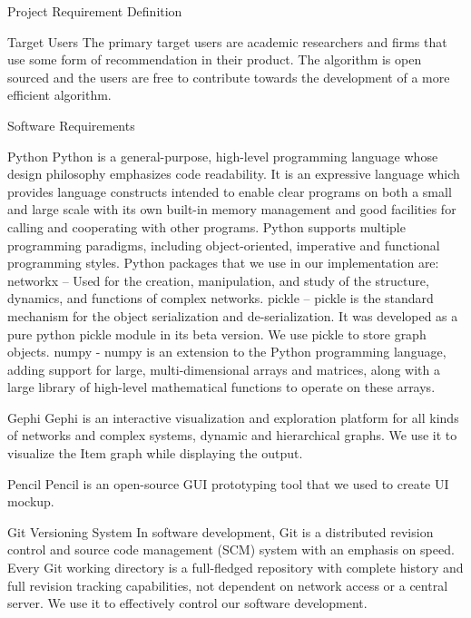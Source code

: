 \documentclass{report}
\begin{document}
\begin{projChapter}{Project Requirement Definition}
 \begin{projSection}{Target Users}
  The primary target users are academic researchers and firms that use some form of recommendation in their product. The algorithm is open sourced and the users are free to contribute towards the development of a more efficient algorithm.
 \end{projSection}
 
 \begin{projSection}{Software Requirements}
  \begin{projSubSection}{Python}
  Python is a general-purpose, high-level programming language whose design philosophy emphasizes code readability. It is an expressive language which provides language constructs intended to enable clear programs on both a small and large scale with its own built-in memory management and good facilities for calling and cooperating with other programs. Python supports multiple programming paradigms, including object-oriented, imperative and functional programming styles. Python packages that we use in our implementation are:
  networkx – Used for the creation, manipulation, and study of the structure, dynamics, and functions of complex networks.
  pickle – pickle is the standard mechanism for the object serialization and de-serialization. It was developed as a pure python pickle module in its beta version.  We use pickle to store graph objects.
  numpy -  numpy is an extension to the Python programming language, adding support for large, multi-dimensional arrays and matrices, along with a large library of high-level mathematical functions to operate on these arrays.
  \end{projSubSection}
  
  \begin{projSubSection}{Gephi}
  Gephi is an interactive visualization and exploration platform for all kinds of networks  and complex systems, dynamic and hierarchical graphs. We use it to visualize the Item graph while displaying the output.
  \end{projSubSection}
  
  \begin{projSubSection}{Pencil}
  Pencil is an open-source GUI prototyping tool that we used to create UI mockup.
  \end{projSubSection}
  
  \begin{projSubSection}{Git Versioning System}
  In software development, Git is a distributed revision control and source code management (SCM) system with an emphasis on speed. Every Git working directory is a full-fledged repository with complete history and full revision tracking capabilities, not dependent on network access or a central server. We use it to effectively control our software development.
  \end{projSubSection}
  

\end{projSection}
\end{projChapter}
\end{document}
